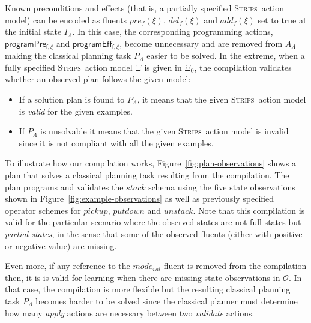 \documentclass[3p,times]{elsarticle}
\newcommand{\strips}{\textsc{Strips}}     %
\begin{document}
Known preconditions and effects (that is, a partially specified \strips\ action model) can be encoded as fluents $pre_f(\xi)$, $del_f(\xi)$ and $add_f(\xi)$ set to true at the initial state $I_{\Lambda}$. In this case, the corresponding programming actions, $\mathsf{programPre_{f,\xi}}$ and $\mathsf{programEff_{f,\xi}}$, become unnecessary and are removed from $A_{\Lambda}$ making the classical planning task $P_{\Lambda}$ easier to be solved. In the extreme, when a fully specified \strips\ action model $\Xi$ is given in $\Xi_0$, the compilation validates whether an observed plan follows the given model:
\begin{itemize}
\item If a solution plan is found to $P_{\Lambda}$, it means that the given \strips\ action model is {\em valid} for the given examples.
\item If $P_{\Lambda}$ is unsolvable it means that the given \strips\ action model is invalid since it is not compliant with all the given examples. %
\end{itemize}
  
To illustrate how our compilation works, Figure~\ref{fig:plan-observations} shows a plan that solves a classical planning task resulting from the compilation. The plan programs and validates the $stack$ schema using the five state observations shown in Figure~\ref{fig:example-observations} as well as previously specified operator schemes for $pickup$, $putdown$ and $unstack$. Note that this compilation is valid for the particular scenario where the observed states are not full states but {\em partial states}, in the sense that some of the observed fluents (either with positive or negative value) are missing.

Even more, if any reference to the $mode_{val}$ fluent is removed from the compilation then, it is is valid for learning when there are missing state observations in $\mathcal{O}$. In that case, the compilation is more flexible but the resulting classical planning task $P_{\Lambda}$ becomes harder to be solved since the classical planner must determine how many {\em apply} actions are necessary between two {\em validate} actions.  
\end{document}
